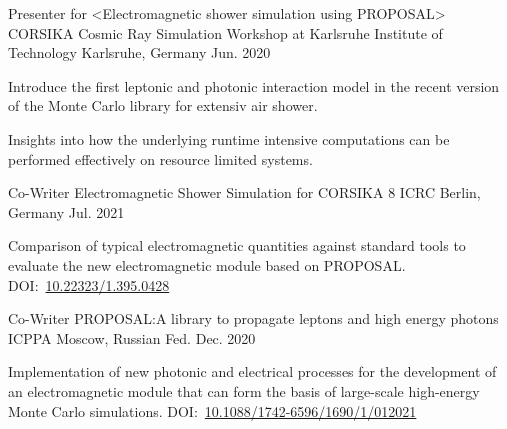 \documentclass[11pt, a4paper]{Awesome-CV/awesome-cv}
\begin{document}
\begin{cventries}

    \cventry
    {Presenter for <Electromagnetic shower simulation using PROPOSAL>} %
    {CORSIKA Cosmic Ray Simulation Workshop at Karlsruhe Institute of Technology} %
    {Karlsruhe, Germany} %
    {Jun. 2020} %
    {
        \begin{cvitems} %
        \item {Introduce the first leptonic and photonic interaction model in
                the recent version of the Monte Carlo library for extensiv air
            shower.}
        \item {Insights into how the underlying runtime intensive computations can be performed effectively on resource limited systems.}
        \end{cvitems}
    }

    \cventry
    {Co-Writer} %
    {Electromagnetic Shower Simulation for CORSIKA 8} %
    {ICRC Berlin, Germany} %
    {Jul. 2021} %
    {
        \begin{cvitems} %
        \item {Comparison of typical electromagnetic quantities against standard tools to evaluate the new electromagnetic module based on PROPOSAL.  DOI:~\href{https://doi.org/10.22323/1.395.0428}{10.22323/1.395.0428}
            }
        \end{cvitems}
    }

    \cventry
    {Co-Writer} %
    {PROPOSAL:\@ A library to propagate leptons and high energy photons} %
    {ICPPA Moscow, Russian Fed.} %
    {Dec. 2020} %
    {
        \begin{cvitems} %
        \item {Implementation of new photonic and electrical processes for the
                development of an electromagnetic module that can form the basis of
            large-scale high-energy Monte Carlo simulations. DOI:~\href{https://doi.org/10.1088/1742-6596/1690/1/012021}{10.1088/1742-6596/1690/1/012021}}
        \end{cvitems}
    }

\end{cventries}
\end{document}
